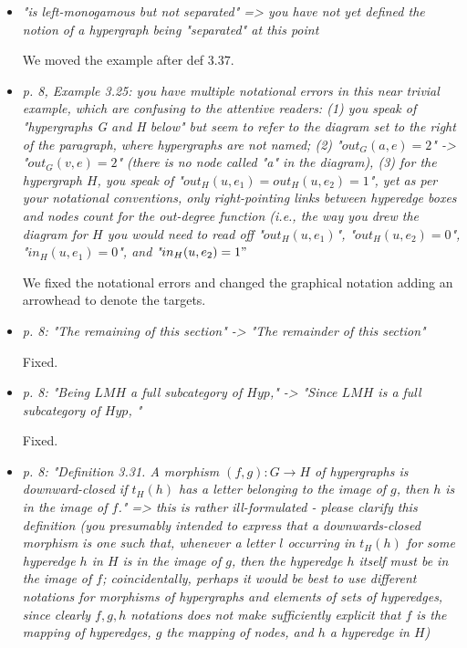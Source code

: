 \documentclass[english,11pt,a4paper]{article}
\begin{document}
\begin{itemize}
	
	
	\item \emph{ "is left-monogamous but not separated" => you have not yet defined the notion of a hypergraph being "separated" at this point}
	
	We moved the example after  def $3.37$.
	
	\item \emph{ p. 8, Example 3.25: you have multiple notational errors in this near trivial example, which are confusing to the attentive readers: (1) you speak of "hypergraphs G and H below" but seem to refer to the diagram set to the right of the paragraph, where hypergraphs are not named; (2) "$out_G(a, e) = 2$" -> "$out_G(v, e) = 2$" (there is no node called "a" in the diagram), (3) for the hypergraph $H$, you speak of "$out_H(u, e_1)=out_H(u, e_2)=1$", yet as per your notational conventions, only right-pointing links between hyperedge boxes and nodes count for the out-degree function (i.e., the way you drew the diagram for $H$ you would need to read off "$out_H(u, e_1)$", "$out_H(u, e_2)=0$", "$in_H(u,e_1)=0$", and "$in_H(u,e_2)=1"$}
	
	We fixed the notational errors and changed the graphical notation adding an arrowhead to denote the targets.
	
	\item \emph{ p. 8: "The remaining of this section" -> "The remainder of this section"}
	
	Fixed.
	
	\item \emph{ p. 8: "Being $LMH$ a full subcategory of $Hyp$," -> "Since $LMH$ is a full subcategory of $Hyp$, "}
	
	Fixed.
	
	\item \emph{ p. 8: "Definition 3.31. A morphism $(f, g) : G \to H$ of hypergraphs is downward-closed if $t_H(h)$ has a letter belonging to the image of $g$, then $h$ is in the image of $f$." => this is rather ill-formulated - please clarify this definition (you presumably intended to express that a downwards-closed morphism is one such that, whenever a letter $l$ occurring in $t_H(h)$ for some hyperedge $h$ in $H$ is in the image of $g$, then the hyperedge $h$ itself must be in the image of $f$; coincidentally, perhaps it would be best to use different notations for morphisms of hypergraphs and elements of sets of hyperedges, since clearly $f,g,h$ notations does not make sufficiently explicit that $f$ is the mapping of hyperedges, $g$ the mapping of nodes, and $h$ a hyperedge in $H$)}
	

\end{itemize}
\end{document}
